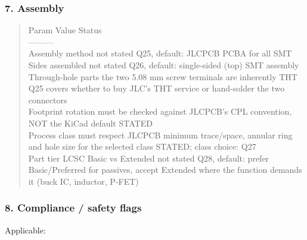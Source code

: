\documentclass[11pt,a4paper]{article}
\begin{document}
\subsubsection*{7. Assembly}
\begin{quote}\small\ttfamily\raggedright
\textbar{} Param \textbar{} Value \textbar{} Status \textbar{}\\
\textbar{}---\textbar{}---\textbar{}---\textbar{}\\
\textbar{} Assembly method \textbar{} not stated \textbar{} Q25, default: JLCPCB PCBA for all SMT \textbar{}\\
\textbar{} Sides assembled \textbar{} not stated \textbar{} Q26, default: single-sided (top) SMT assembly \textbar{}\\
\textbar{} Through-hole parts \textbar{} the two 5.08 mm screw terminals are inherently THT \textbar{} Q25 covers whether to buy JLC's THT service or hand-solder the two connectors \textbar{}\\
\textbar{} Footprint rotation \textbar{} must be checked against JLCPCB's CPL convention, NOT the KiCad default \textbar{} STATED \textbar{}\\
\textbar{} Process class \textbar{} must respect JLCPCB minimum trace/space, annular ring and hole size for the selected class \textbar{} STATED; class choice: Q27 \textbar{}\\
\textbar{} Part tier \textbar{} LCSC Basic vs Extended not stated \textbar{} Q28, default: prefer Basic/Preferred for passives, accept Extended where the function demands it (buck IC, inductor, P-FET) \textbar{}
\end{quote}
\subsubsection*{8. Compliance / safety flags}
Applicable:
\end{document}
